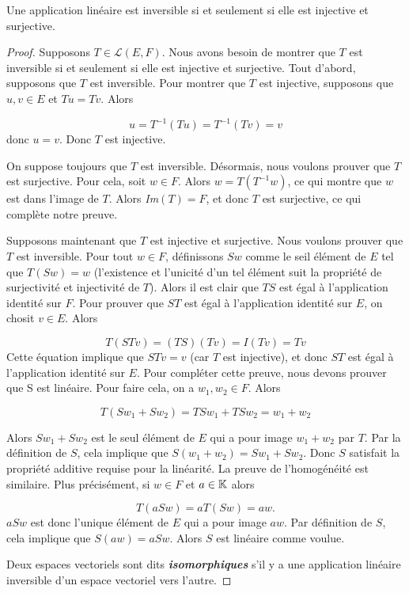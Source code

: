 \documentclass[12pt]{book}
\begin{document}
\begin{prop}
Une application linéaire est inversible si et seulement si elle est injective et surjective.

\begin{proof}
Supposons $T\in\mathcal{L}(E,F)$. Nous avons besoin de montrer que $T$ est inversible si et seulement si elle est injective et surjective.
Tout d'abord, supposons que $T$ est inversible. Pour montrer que $T$ est injective, supposons que $u,v\in E$ et $Tu=Tv$. Alors 

\begin{equation*}
    u=T^{-1}(Tu)=T^{-1}(Tv)=v
\end{equation*}
donc $u=v$. Donc $T$ est injective.

On suppose toujours que $T$ est inversible. Désormais, nous voulons prouver que $T$ est surjective. Pour cela, soit $w\in F$. Alors $w=T(T^{-1}w)$, ce qui montre que $w$ est dans l'image de $T$. Alors \textit{Im}$(T)=F$, et donc $T$ est surjective, ce qui complète notre preuve.

Supposons maintenant que $T$ est injective et surjective. Nous voulons prouver que $T$ est inversible. Pour tout $w\in F$, définissons $Sw$ comme le seil élément de $E$ tel que $T(Sw)=w$ (l'existence et l'unicité d'un tel élément suit la propriété de surjectivité et injectivité de $T$). Alors il est clair que $TS$ est égal à l'application identité sur $F$. Pour prouver que $ST$ est égal à l'application identité sur $E$, on chosit $v\in E$. Alors

\begin{equation*}
    T(STv)=(TS)(Tv)=I(Tv)=Tv
\end{equation*}
Cette équation implique que $STv=v$ (car $T$ est injective), et donc $ST$ est égal à l'application identité sur $E$. Pour compléter cette preuve, nous devons prouver que S est linéaire. Pour faire cela, on a $w_1, w_2\in F$. Alors 

\begin{equation*}
    T(Sw_1 + Sw_2) = TSw_1 + TSw_2 = w_1 + w_2
\end{equation*}

Alors $Sw_1+Sw_2$ est le seul élément de $E$ qui a pour image $w_1+w_2$ par $T$. Par la définition de $S$, cela implique que $S(w_1+w_2)=Sw_1+Sw_2$. Donc $S$ satisfait la propriété additive requise pour la linéarité. La preuve de l'homogénéité est similaire. Plus précisément, si $w\in F$ et $a\in \mathbb{K}$ alors

\begin{equation*}
    T(aSw)=aT(Sw)=aw.
\end{equation*}
$aSw$ est donc l'unique élément de $E$ qui a pour image $aw$. Par définition de $S$, cela implique que $S(aw)=aSw$. Alors $S$ est linéaire comme voulue. 

\medskip

Deux espaces vectoriels sont dits \textbf{\textit{isomorphiques}} s'il y a une application linéaire inversible d'un espace vectoriel vers l'autre. 

\end{proof}
\end{prop}
\end{document}
